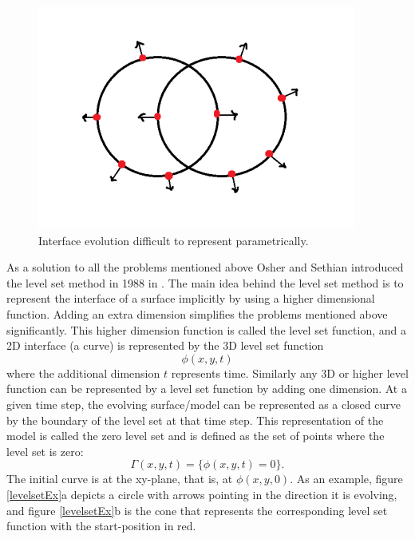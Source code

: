 \begin{figure}[h!]
\centering
\includegraphics[width=.5\textwidth]{levelset/twoCircles}
\caption{Interface evolution difficult to represent parametrically.}
\label{problematicEvo}
\end{figure}

As a solution to all the problems mentioned above Osher and Sethian introduced the level set method in 1988 in \cite{osher88}. The main idea behind the level set method is to represent the interface of a surface implicitly by using a higher dimensional function. Adding an extra dimension simplifies the problems mentioned above significantly. This higher dimension function is called the level set function, and a 2D interface (a curve) is represented by the 3D level set function
\begin{equation}
\phi(x, y, t) 
\end{equation}
where the additional dimension \(t\) represents time. Similarly any 3D or higher level function can be represented by a level set function by adding one dimension. At a given time step, the evolving surface/model can be represented as a closed curve by the boundary of the level set at that time step. This representation of the model is called the zero level set and is defined as the set of points where the level set is zero:
\begin{equation}
\Gamma(x, y, t) = \{\phi(x, y, t) = 0\}. 
\end{equation}
The initial curve is at the xy-plane, that is, at \(\phi(x,y,0)\). As an example, figure \ref{levelsetEx}a depicts a circle with arrows pointing in the direction it is evolving, and figure \ref{levelsetEx}b is the cone that represents the corresponding level set function with the start-position in red.

